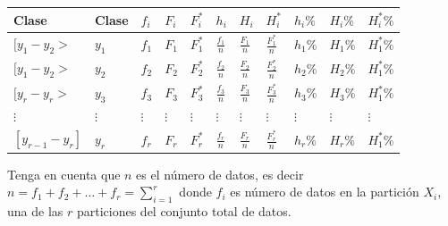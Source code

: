 \documentclass[
  10pt,
]{krantz}
\theoremstyle{definition}
\theoremstyle{definition}
\theoremstyle{definition}
\theoremstyle{definition}
\theoremstyle{remark}
\begin{document}
\begin{longtable}[]{@{}
  >{\centering\arraybackslash}p{}
  >{\centering\arraybackslash}p{}
  >{\centering\arraybackslash}p{}
  >{\centering\arraybackslash}p{}
  >{\centering\arraybackslash}p{}
  >{\centering\arraybackslash}p{}
  >{\centering\arraybackslash}p{}
  >{\centering\arraybackslash}p{}
  >{\centering\arraybackslash}p{}
  >{\centering\arraybackslash}p{}
  >{\centering\arraybackslash}p{}@{}}
\toprule
Clase & Clase & \(f_i\) & \(F_i\) & \(F_i^*\) & \(h_i\) & \(H_i\) & \(H_i^*\) & \(h_i\%\) & \(H_i\%\) & \(H_i^*\%\) \\
\midrule
\endhead
\([y_1-y_2>\) & \(y_1\) & \(f_1\) & \(F_1\) & \(F_1^*\) & \(\frac{f_1}{n}\) & \(\frac{F_1}{n}\) & \(\frac{F_1^*}{n}\) & \(h_1\%\) & \(H_1\%\) & \(H_1^*\%\) \\
\([y_1-y_2>\) & \(y_2\) & \(f_2\) & \(F_2\) & \(F_2^*\) & \(\frac{f_2}{n}\) & \(\frac{F_2}{n}\) & \(\frac{F_2^*}{n}\) & \(h_2\%\) & \(H_2\%\) & \(H_1^*\%\) \\
\([y_{r}-y_r>\) & \(y_3\) & \(f_3\) & \(F_3\) & \(F_3^*\) & \(\frac{f_3}{n}\) & \(\frac{F_3}{n}\) & \(\frac{F_3^*}{n}\) & \(h_3\%\) & \(H_3\%\) & \(H_1^*\%\) \\
\(\vdots\) & \(\vdots\) & \(\vdots\) & \(\vdots\) & \(\vdots\) & \(\vdots\) & \(\vdots\) & \(\vdots\) & \(\vdots\) & \(\vdots\) & \(\vdots\) \\
\([ y_{r-1}-y_r]\) & \(y_r\) & \(f_r\) & \(F_r\) & \(F_r^*\) & \(\frac{f_r}{n}\) & \(\frac{F_r}{n}\) & \(\frac{F_r^*}{n}\) & \(h_r\%\) & \(H_r\%\) & \(H_1^*\%\) \\
\bottomrule
\end{longtable}

Tenga en cuenta que \(n\) es el número de datos, es decir \(n=f_1+f_2+\ldots+f_r=\sum_{i=1}^r\) donde \(f_i\) es número de datos en la partición \(X_i\), una de las \(r\) particiones del conjunto total de datos.
\end{document}
